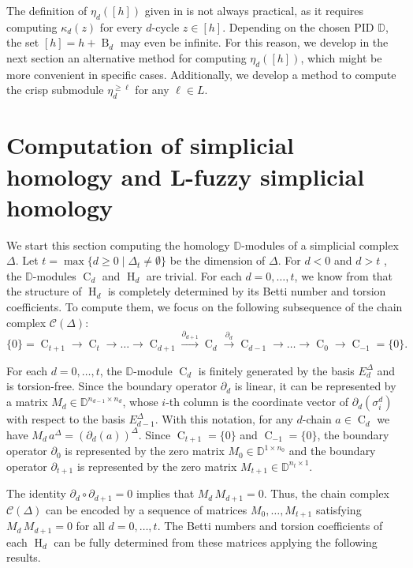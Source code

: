 \documentclass[a4paper,10pt]{article}
\newcommand{\bbd}{\mathbb{D}}
\newcommand{\calc}{\mathcal{C}}
\DeclareMathOperator{\Co}{C}
\DeclareMathOperator{\Bo}{B}
\DeclareMathOperator{\Ho}{H}
\begin{document}
The definition of \(\eta_d([h])\) given in  is not always practical, as it requires computing \(\kappa_d(z)\) for every \(d\)-cycle \(z \in [h]\). Depending on the chosen PID \(\bbd\), the set \([h] = h + \Bo_d\) may even be infinite. For this reason, we develop in the next section an alternative method for computing \(\eta_d([h])\), which might be more convenient in specific cases. Additionally, we develop a method to compute the crisp submodule \(\eta_d^{\geq \ell}\) for any \(\ell \in L\).

\section{Computation of simplicial homology and L-fuzzy simplicial homology}
\label{sec:computation}

We start this section computing the homology \(\bbd\)-modules of a simplicial complex \(\Delta\).
Let \(t = \max\{d \geq 0 \mid \Delta_t \neq \emptyset\}\) be the dimension of \(\Delta\). For \(d<0\) and \(d>t\) , the \(\bbd\)-modules \(\Co_d\) and \(\Ho_d\) are trivial. For each \(d = 0,\dots,t\), we know from  that the structure of \(\Ho_d\) is completely determined by its Betti number and torsion coefficients. To compute
them, we focus on the following subsequence of the chain complex \(\calc(\Delta)\):
\[
\{0\}=\Co_{t+1} \xrightarrow{} \Co_t \xrightarrow{} \dots \xrightarrow{} 
\Co_{d+1} \xrightarrow{\partial_{d+1}} \Co_d \xrightarrow{\partial_d} \Co_{d-1}
\xrightarrow{} \dots \xrightarrow{} \Co_0 \xrightarrow{} \Co_{-1} = \{0\}.
\]

For each \(d = 0,\dots,t\), the \(\bbd\)-module \(\Co_d\) is finitely generated by the basis \(E^{\Delta}_{d}\) and is torsion-free. Since the boundary operator \(\partial_d\) is linear, it can be represented by a matrix \(M_d \in \bbd^{n_{d-1} \times n_d}\), whose \(i\)-th column is the coordinate vector of \(\partial_d(\sigma^d_i)\) with respect to the basis \(E^{\Delta}_{d-1}\). With this notation, for any \(d\)-chain \(a \in \Co_d\) we have \(M_d\, a^{\Delta} = (\partial_d(a))^{\Delta}\).
Since \(\Co_{t+1}=\{0\}\) and \(\Co_{-1}=\{0\}\), the boundary operator \(\partial_0\) is represented by the zero matrix \(M_0 \in \bbd^{1 \times n_0}\) and the boundary operator \(\partial_{t+1}\) is represented by the zero matrix \(M_{t+1} \in \bbd^{n_t \times 1}\).

The identity \(\partial_d \circ \partial_{d+1} = 0\) implies that \(M_d \, M_{d+1} = 0\). Thus, the chain complex \(\calc(\Delta)\) can be encoded by a sequence of matrices \(M_0,\dots,M_{t+1}\) satisfying \(M_d \, M_{d+1} = 0\) for all \(d=0,\dots,t\). The Betti numbers and torsion coefficients of each \(\Ho_d\) can be fully determined from these matrices applying the following results.
\end{document}
